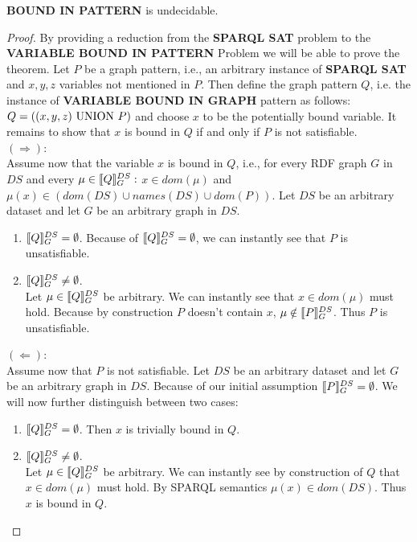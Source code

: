 \begin{theorem}
	\textbf{BOUND IN PATTERN} is undecidable.
\end{theorem}
\begin{proof}
By providing a reduction from the \textbf{SPARQL SAT} problem to the
\textbf{VARIABLE BOUND IN PATTERN} Problem we will be able to prove the theorem.
Let $P$ be a graph pattern, i.e., an arbitrary instance of \textbf{SPARQL SAT} and
$x,y,z$ variables not mentioned in $P$. Then define the graph pattern $Q$,
i.e. the instance of \textbf{VARIABLE BOUND IN GRAPH} pattern as follows: $Q =
((x,y,z) \mbox{ UNION }  P)$ and choose $x$ to be the potentially bound variable.
It remains to show that $x$ is bound in $Q$  if and only if $P$ is not
satisfiable.\\
$(\Rightarrow)$:\\
Assume now that the variable $x$ is bound in $Q$, i.e., for every RDF graph $G$
in $DS$ and every $\mu \in \llbracket Q \rrbracket^{DS}_G:$ $x \in dom(\mu)$ and $\mu(x) \in
(dom(DS) \cup names(DS) \cup dom(P))$. Let $DS$ be an arbitrary dataset and let
$G$ be an arbitrary graph in $DS$.
\begin{enumerate}
	\item $\llbracket Q \rrbracket^{DS}_G = \emptyset$. Because of $\llbracket Q \rrbracket^{DS}_G =
		\emptyset$, we can instantly see that $P$ is unsatisfiable.
	\item $\llbracket Q \rrbracket^{DS}_G \neq \emptyset$.\\
		Let $\mu \in \llbracket Q \rrbracket^{DS}_G$ be arbitrary.
		We can instantly see that $x \in dom(\mu)$ must hold. 
		Because by construction $P$ doesn't contain $x$, 
		$\mu \notin \llbracket P \rrbracket^{DS}_G$. Thus $P$ is unsatisfiable.
\end{enumerate}
\noindent$(\Leftarrow)$:\\
Assume now that $P$ is not satisfiable. Let $DS$ be an arbitrary dataset and let
$G$ be an arbitrary graph in $DS$. Because of our initial assumption $\llbracket P
\rrbracket^{DS}_G = \emptyset$. We will now further distinguish between two cases:
\begin{enumerate}
	\item $\llbracket Q \rrbracket^{DS}_G = \emptyset$. Then $x$ is trivially bound in $Q$.
	
	\item $\llbracket Q \rrbracket^{DS}_G \neq \emptyset$.\\
		Let $\mu \in \llbracket Q \rrbracket^{DS}_G$ be arbitrary.
		We can instantly see by construction of $Q$ that $x \in
		dom(\mu)$ must hold. By SPARQL semantics $\mu(x) \in dom(DS)$. Thus $x$
		is bound in $Q$.\qedhere
\end{enumerate}
\end{proof} 

